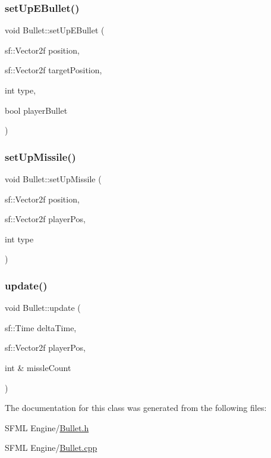 \subsubsection{\texorpdfstring{set\+Up\+E\+Bullet()}{setUpEBullet()}}
{\footnotesize\ttfamily void Bullet\+::set\+Up\+E\+Bullet (\begin{DoxyParamCaption}\item[{sf\+::\+Vector2f}]{position,  }\item[{sf\+::\+Vector2f}]{target\+Position,  }\item[{int}]{type,  }\item[{bool}]{player\+Bullet }\end{DoxyParamCaption})}

\mbox{\label{class_bullet_a5ee57e44e79f829920f4c117937d5f97}} 
\subsubsection{\texorpdfstring{set\+Up\+Missile()}{setUpMissile()}}
{\footnotesize\ttfamily void Bullet\+::set\+Up\+Missile (\begin{DoxyParamCaption}\item[{sf\+::\+Vector2f}]{position,  }\item[{sf\+::\+Vector2f}]{player\+Pos,  }\item[{int}]{type }\end{DoxyParamCaption})}

\mbox{\label{class_bullet_ac1793d563983d2503cc562e0b3e1eee7}} 
\subsubsection{\texorpdfstring{update()}{update()}}
{\footnotesize\ttfamily void Bullet\+::update (\begin{DoxyParamCaption}\item[{sf\+::\+Time}]{delta\+Time,  }\item[{sf\+::\+Vector2f}]{player\+Pos,  }\item[{int \&}]{missle\+Count }\end{DoxyParamCaption})}



The documentation for this class was generated from the following files\+:\begin{DoxyCompactItemize}
\item 
S\+F\+M\+L Engine/\hyperlink{_bullet_8h}{Bullet.\+h}\item 
S\+F\+M\+L Engine/\hyperlink{_bullet_8cpp}{Bullet.\+cpp}\end{DoxyCompactItemize}
